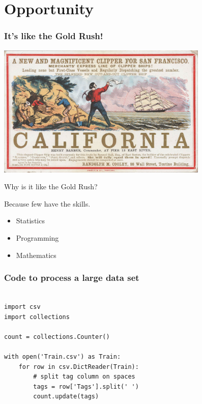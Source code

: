 \documentclass{beamer}
\begin{document}
\section{Opportunity}
\begin{frame}


\frametitle{It's like the Gold Rush!}
\centerline{\includegraphics[height=2.5in]{figs/goldrush.jpg}}


\end{frame}
\begin{frame}


Why is it like the Gold Rush?


\end{frame}
\begin{frame}


Because few have the skills.

\begin{itemize}
\item \Huge{Statistics}
\item \Huge{Programming}
\item \Huge{Mathematics}
\end{itemize}

\end{frame}
\begin{frame}[fragile]


\frametitle{Code to process a large data set}

\begin{verbatim}

import csv
import collections

count = collections.Counter()

with open('Train.csv') as Train:
    for row in csv.DictReader(Train):
        # split tag column on spaces
        tags = row['Tags'].split(' ')
        count.update(tags)

\end{verbatim}


\end{frame}
\end{document}
